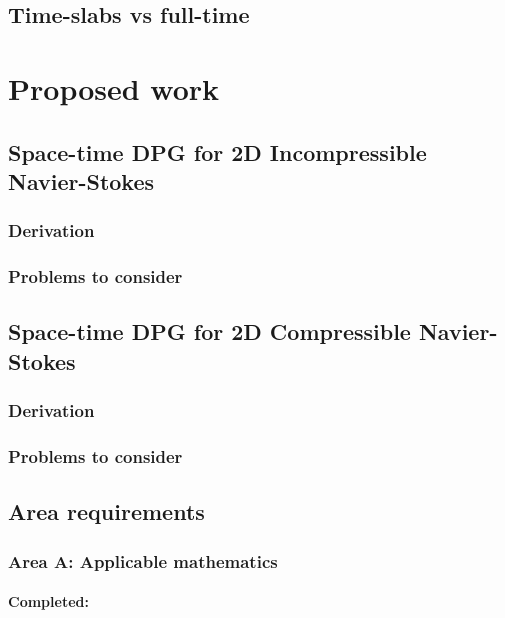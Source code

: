 \documentclass{report}
\begin{document}
\section{Time-slabs vs full-time}



\chapter{Proposed work}



\section{Space-time DPG for 2D Incompressible Navier-Stokes}

\subsection{Derivation}

\subsection{Problems to consider}


\section{Space-time DPG for 2D Compressible Navier-Stokes}

\subsection{Derivation}

\subsection{Problems to consider}


\section{Area requirements}

\subsection{Area A: Applicable mathematics}
\subsubsection*{Completed:}
\end{document}
